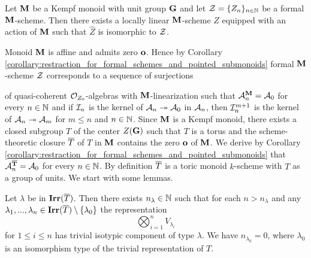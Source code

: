 \begin{theorem}\label{theorem:every_formal_over_kempf_monoid_is_formal_neighborhood}
Let $\mathbf{M}$ be a Kempf monoid with unit group $\mathbf{G}$ and let ${\mathcal Z} = \{Z_n\}_{n\in {\mathbb N}}$ be a formal $\mathbf{M}$-scheme. Then there exists a locally linear $\mathbf{M}$-scheme $Z$ equipped with an action of $\mathbf{M}$ such that $\widehat{Z}$ is isomorphic to ${\mathcal Z}$.
\end{theorem}
\noindent
Monoid $\mathbf{M}$ is affine and admits zero $\mathbf{o}$. Hence by Corollary \ref{corollary:restraction_for_formal_schemes_and_pointed_submonoids} formal $\mathbf{M}$-scheme ${\mathcal Z}$ corresponds to a sequence of surjections
\begin{center}
\end{center}
of quasi-coherent ${\mathcal O}_{Z_0}$-algebras with $\mathbf{M}$-linearization such that ${\mathcal A}_n^{\mathbf{M}} = {\mathcal A}_0$ for every $n\in {\mathbb N}$ and if ${\mathcal I}_n$ is the kernel of ${\mathcal A}_n\twoheadrightarrow {\mathcal A}_0$ in ${\mathcal A}_n$, then ${\mathcal I}_n^{m+1}$ is the kernel of ${\mathcal A}_n\twoheadrightarrow {\mathcal A}_m$ for $m\leq n$ and $n\in {\mathbb N}$. Since $\mathbf{M}$ is a Kempf monoid, there exists a closed subgroup $T$ of the center $Z(\mathbf{G})$ such that $T$ is a torus and the scheme-theoretic closure $\overline{T}$ of $T$ in $\mathbf{M}$ contains the zero $\mathbf{o}$ of $\mathbf{M}$. We derive by Corollary \ref{corollary:restraction_for_formal_schemes_and_pointed_submonoids} that ${\mathcal A}_n^{\mathbf{\overline{T}}} = {\mathcal A}_0$ for every $n\in {\mathbb N}$. By definition $\overline{T}$ is a toric monoid $k$-scheme with $T$ as a group of units. We start with some lemmas.

\begin{lemma}\label{lemma:stablization_for_representations}
Let $\lambda$ be in $\mathbf{Irr}(\overline{T})$. Then there exists $n_{\lambda}\in {\mathbb N}$ such that for each $n > n_{\lambda}$ and any $\lambda_1,...,\lambda_n\in \mathbf{Irr}(\overline{T})\setminus \{\lambda_0\}$ the representation
$$\bigotimes_{i=1}^nV_{\lambda_i}$$ 
for $1\leq i\leq n$ has trivial isotypic component of type $\lambda$. We have $n_{\lambda_0} = 0$, where $\lambda_0$ is an isomorphism type of the trivial representation of $T$.
\end{lemma}

